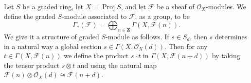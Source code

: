 Let $S$ be a graded ring, let $X = \operatorname{Proj} S$, and let $\mathcal{F}$ be a sheaf of $\mathcal{O}_X$-modules. We define the graded $S$-module associated to $\mathcal{F}$, as a group, to be
$$\Gamma_*(\mathcal{F}) = \bigoplus_{n \in \mathbf{Z}} \Gamma(X, \mathcal{F}(n)).$$
We give it a structure of graded $S$-module as follows. If $s \in S_d$, then $s$ determines in a natural way a global section $s \in \Gamma(X, \mathcal{O}_X(d))$. Then for any $t \in \Gamma(X, \mathcal{F}(n))$ we define the product $s \cdot t$ in $\Gamma(X, \mathcal{F}(n + d))$ by taking the tensor product $s \otimes t$ and using the natural map $\mathcal{F}(n) \otimes \mathcal{O}_X(d) \cong \mathcal{F}(n + d)$.
